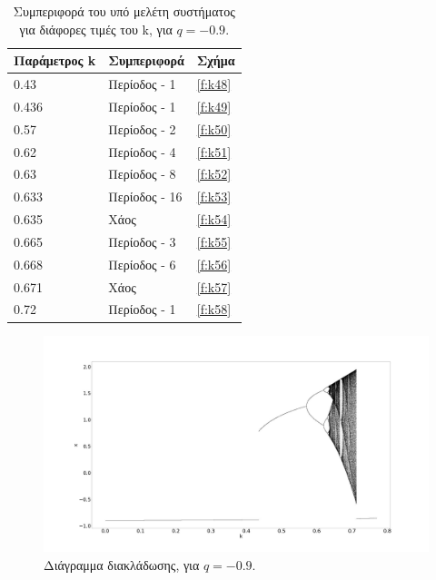 \begin{table}[ht]
	\centering
	\caption{ Συμπεριφορά του υπό μελέτη συστήματος για διάφορες τιμές του k, για $q=-0.9$.}
	\label{tab:abc4}
	\begin{tabular}{l | l | l}
		Παράμετρος k & Συμπεριφορά & Σχήμα\\
		\hline
		0.43 &  Περίοδος -  1 & \ref{f:k48}\\
		0.436 &  Περίοδος -  1 & \ref{f:k49}\\
		0.57& Περίοδος -  2 & \ref{f:k50}\\
		0.62& Περίοδος -  4 & \ref{f:k51}\\
		0.63 &  Περίοδος -  8 & \ref{f:k52}\\
		0.633& Περίοδος -  16 & \ref{f:k53}\\
		0.635& Χάος & \ref{f:k54}\\
		0.665 & Περίοδος -  3 & \ref{f:k55}\\
		0.668 & Περίοδος -  6 & \ref{f:k56}\\
		0.671 & Χάος & \ref{f:k57}\\
		0.72 & Περίοδος -  1& \ref{f:k58}\\
	\end{tabular}
\end{table}

\begin{figure}[ht]
	\centering
	\includegraphics[width=1\linewidth]{LateX images/graphs q09/g1}
	\caption{ Διάγραμμα διακλάδωσης, για $q=-0.9$.}
	\label{f:g14}
\end{figure}

